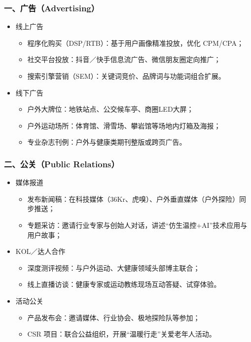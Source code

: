\documentclass[UTF8]{report}
\theoremstyle{MyLineTheoremStyle} %
\theoremstyle{MyBlockTheoremStyle} %
\theoremstyle{MySubsubsectionStyle} %
\begin{document}
  \subsubsection{一、广告（Advertising）}
    \begin{itemize}
      \item 线上广告  
        \begin{itemize}
          \item 程序化购买（DSP/RTB）：基于用户画像精准投放，优化 CPM/CPA；  
          \item 社交平台投放：抖音／快手信息流广告、微信朋友圈定向推广；  
          \item 搜索引擎营销（SEM）：关键词竞价、品牌词与功能词组合扩展。  
        \end{itemize}
      \item 线下广告  
        \begin{itemize}
          \item 户外大牌位：地铁站点、公交候车亭、商圈LED大屏；  
          \item 户外运动场所：体育馆、滑雪场、攀岩馆等场地内灯箱及海报；  
          \item 专业杂志刊例：户外与健康类期刊整版或跨页广告。  
        \end{itemize}
    \end{itemize}

  \subsubsection{二、公关（Public Relations）}
    \begin{itemize}
      \item 媒体报道  
        \begin{itemize}
          \item 发布新闻稿：在科技媒体（36Kr、虎嗅）、户外垂直媒体（户外探险）同步推送；  
          \item 专题采访：邀请行业专家与创始人对话，讲述“仿生温控+AI”技术应用与用户故事；  
        \end{itemize}
      \item KOL／达人合作  
        \begin{itemize}
          \item 深度测评视频：与户外运动、大健康领域头部博主联合；  
          \item 线上直播访谈：健康专家或运动教练现场互动答疑、试穿体验。  
        \end{itemize}
      \item 活动公关  
        \begin{itemize}
          \item 产品发布会：邀请媒体、行业协会、极地探险队等参加；  
          \item CSR 项目：联合公益组织，开展“温暖行走”关爱老年人活动。  
        \end{itemize}
    \end{itemize}
\end{document}
